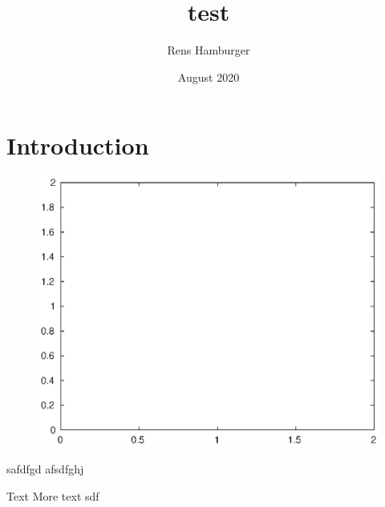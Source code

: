 \documentclass{article}
\title{test}
\author{Rens Hamburger}
\date{August 2020}
\begin{document}
\maketitle

\section{Introduction}

\begin{figure}
	\centering
	\includegraphics[width=0.6\linewidth,keepaspectratio]{figures/empty4.eps}
\end{figure}
safdfgd
afsdfghj

Text
More text
sdf
\end{document}
